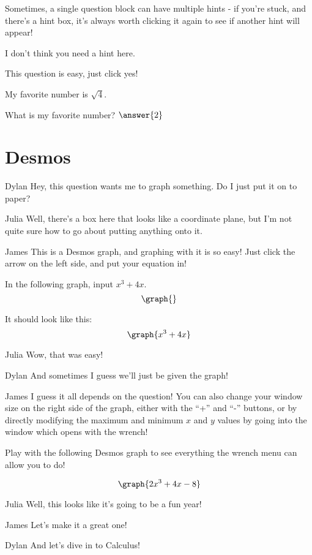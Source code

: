\documentclass{ximera}
\begin{document}
Sometimes, a single question block can have multiple hints - if you're stuck, and there's a hint box, it's always worth clicking it again to see if another hint will appear!

\begin{question}
\begin{hint}
I don't think you need a hint here.
\end{hint}
This question is easy, just click yes!
\begin{multipleChoice}
\end{multipleChoice}

\begin{hint}
My favorite number is $\sqrt{4}$.
\end{hint}
What is my favorite number?
$\answer{2}$
\end{question}

\section{Desmos}
\begin{dialogue}
\item[Dylan] Hey, this question wants me to graph something. Do I just put it on to paper?
\item[Julia] Well, there's a box here that looks like a coordinate plane, but I'm not quite sure how to go about putting anything onto it.
\item[James] This is a Desmos graph, and graphing with it is so easy! Just click the arrow on the left side, and put your equation in!
\end{dialogue}

In the following graph, input $x^3+4x$.
\[
\graph{}
\]

It should look like this:
\[
\graph{x^3+4x}
\]

\begin{dialogue}
\item[Julia] Wow, that was easy!
\item[Dylan] And sometimes I guess we'll just be given the graph!
\item[James] I guess it all depends on the question! You can also change your window size on the right side of the graph, either with the ``+'' and ``-'' buttons, or by directly modifying the maximum and minimum $x$ and $y$ values by going into the window which opens with the wrench!
\end{dialogue}

Play with the following Desmos graph to see everything the wrench menu can allow you to do!

\[
\graph{2x^3+4x-8}
\]

\begin{dialogue}
\item[Julia] Well, this looks like it's going to be a fun year!
\item[James] Let's make it a great one!
\item[Dylan] And let's dive in to Calculus!
\end{dialogue}
\end{document}
